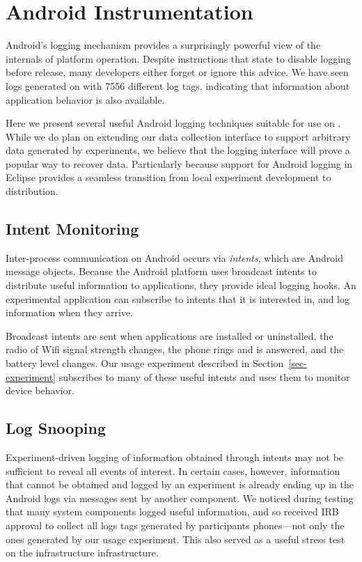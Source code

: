 \section{Android Instrumentation}
\label{sec-logging}


Android's logging mechanism provides a surprisingly powerful view of the
internals of platform operation. Despite instructions that state to disable
logging before release, many developers either forget or ignore this advice.
We have seen logs generated on \PhoneLab{} with \num{7556} different log
tags, indicating that information about application behavior is also
available.

Here we present several useful Android logging techniques suitable for use on
\PhoneLab{}. While we do plan on extending our data collection interface to
support arbitrary data generated by experiments, we believe that the logging
interface will prove a popular way to recover data. Particularly because
support for Android logging in Eclipse provides a seamless transition from
local experiment development to \PhoneLab{} distribution.

\subsection{Intent Monitoring}

Inter-process communication on Android occurs via \textit{intents}, which are
Android message objects. Because the Android platform uses broadcast intents
to distribute useful information to applications, they provide ideal logging
hooks. An experimental application can subscribe to intents that it is
interested in, and log information when they arrive.

Broadcast intents are sent when applications are installed or uninstalled,
the radio of Wifi signal strength changes, the phone rings and is answered,
and the battery level changes. Our usage experiment described in
Section~\ref{sec-experiment} subscribes to many of these useful intents and
uses them to monitor device behavior.

\subsection{Log Snooping}

Experiment-driven logging of information obtained through intents may not be
sufficient to reveal all events of interest. In certain cases, however,
information that cannot be obtained and logged by an experiment is already
ending up in the Android logs via messages sent by another component. We
noticed during testing that many system components logged useful information,
and so received IRB approval to collect all logs tags generated by
participants phones---not only the ones generated by our usage experiment.
This also served as a useful stress test on the \PhoneLab{} infrastructure
infrastructure.

